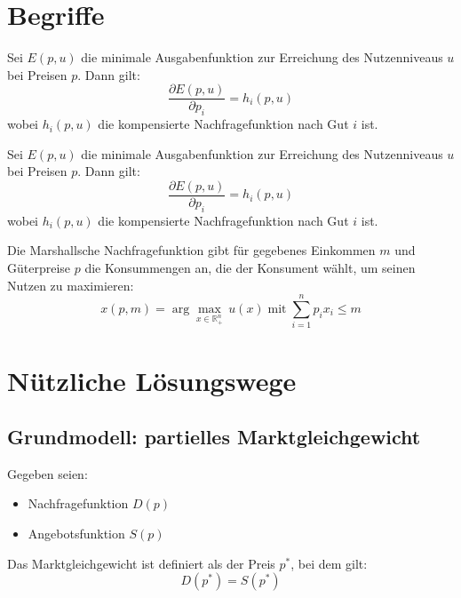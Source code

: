 \chapter{Begriffe}


\begin{lemma} 
	Sei \( E(p, u) \) die minimale Ausgabenfunktion zur Erreichung des Nutzenniveaus \( u \) bei Preisen \( p \). Dann gilt:
	\[
		\frac{\partial E(p, u)}{\partial p_i} = h_i(p, u)
	\]
	wobei \( h_i(p, u) \) die kompensierte Nachfragefunktion nach Gut \( i \) ist.
\end{lemma}
\begin{lemma}
	Sei \( E(p, u) \) die minimale Ausgabenfunktion zur Erreichung des Nutzenniveaus \( u \) bei Preisen \( p \). Dann gilt:
	\[
		\frac{\partial E(p, u)}{\partial p_i} = h_i(p, u)
	\]
	wobei \( h_i(p, u) \) die kompensierte Nachfragefunktion nach Gut \( i \) ist.
\end{lemma}

\begin{definition} 
	Die Marshallsche Nachfragefunktion gibt für gegebenes Einkommen \( m \) und Güterpreise \( p \) die Konsummengen an, die der Konsument wählt, um seinen Nutzen zu maximieren:
	\[
		x(p, m) = \arg\max_{x \in \mathbb{R}^n_+} \, u(x) \; \text{mit} \; \sum_{i=1}^n p_i x_i \leq m
	\]
\end{definition}






\chapter{Nützliche Lösungswege}

\section{Grundmodell: partielles Marktgleichgewicht}

Gegeben seien:
\begin{itemize}
    \item Nachfragefunktion \( D(p) \)
    \item Angebotsfunktion \( S(p) \)
\end{itemize}

Das Marktgleichgewicht ist definiert als der Preis \( p^* \), bei dem gilt:
\[
D(p^*) = S(p^*)
\]

